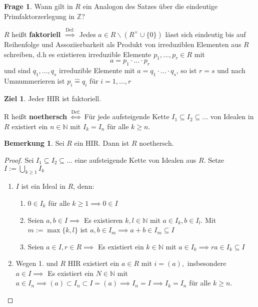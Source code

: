 \documentclass[a4paper, titlepage]{article}
\theoremstyle{definition}
\newtheorem{bem}[satz]{Bemerkung}
\newtheorem*{ziel}{Ziel}
\newtheorem*{frage}{Frage}
\newcommand{\N}{\mathbb{N}}
\newcommand{\Z}{\mathbb{Z}}
\begin{document}
\begin{frage}
    Wann gilt in $R$ ein Analogon des Satzes über die eindeutige Primfaktorzerlegung in $\Z$?
\end{frage}
\begin{definition}
    $R$ heißt \textbf{faktoriell} $\overset{\text{Def:}}{\implies}$ Jedes $a\in R\backslash(R^{\times}\cup \{0\})$ lässt sich eindeutig bis auf Reihenfolge und Assoziierbarkeit als Produkt von irreduziblen Elementen aus $R$ schreiben, d.h es existieren irreduzible Elemente $p_1,...,p_r\in R$ mit $$a=p_1\cdot...\cdot p_r$$
    und sind $q_1,...,q_s$ irreduzible Elemente mit $a=q_1\cdot ... \cdot q_s$, so ist $r=s$ und nach Umnummerieren ist $p_i\widehat=q_i$ für $i=1,...,r$
\end{definition}
\begin{ziel}
    Jeder HIR ist faktoriell.
\end{ziel}
\begin{definition}
    R heißt \textbf{noethersch} $\overset{\text{Def:}}{\Leftrightarrow} $ Für jede aufsteigende Kette $I_1\subseteq I_2\subseteq ... $ von Idealen in $R$ existiert ein $n\in \N$ mit $I_k=I_n$ für alle $k\geq n$.
\end{definition}
\begin{bem}
    Sei $R$ ein HIR. Dann ist $R$ noethersch.
\end{bem}
\begin{proof}
    Sei $I_1\subseteq I_2 \subseteq ...$ eine aufsteigende Kette von Idealen aus $R$. Setze $I:=\bigcup\limits_{k\geq 1}I_k$
    \begin{enumerate}
        \item $I$ ist ein Ideal in $R$, denn:
        \begin{enumerate}[(J1)]
            \item $0\in I_k $ für alle $k\geq 1\implies 0\in I$
            \item Seien $a,b\in I \implies $ Es existieren $k,l\in\N$ mit $a\in I_k,b\in I_l$. Mit $m:=\max\{k,l\}$ ist $a,b\in I_m\implies a+b\in I_m\subseteq I$
            \item Seien $a\in I,r\in R\implies $ Es existiert ein $k\in\N$ mit $a\in I_k \implies ra\in I_k \subseteq I$
        \end{enumerate}  
            \item Wegen 1. und $R$ HIR existiert ein $a\in R $ mit $i=(a),$ insbesondere $a\in I\implies $ Es existiert ein $N\in\N$ mit $a\in I_n\implies (a)\subset I_n\subset I =(a)\implies I_n = I \implies I_k=I_n$ für alle $k\geq n$.
        \end{enumerate}
    \end{proof}
\end{document}
